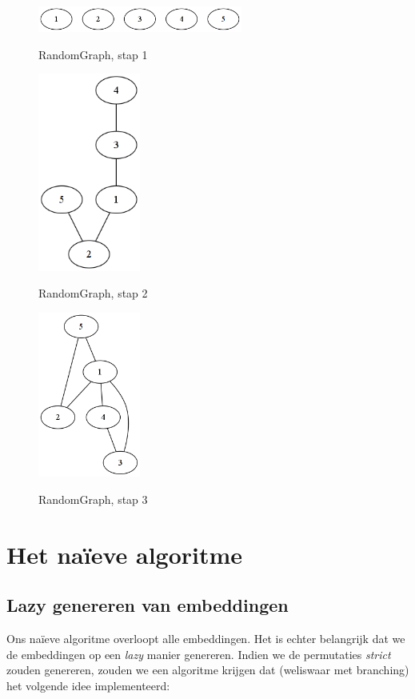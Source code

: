 \documentclass{article}
\begin{document}
\begin{figure}
\begin{center}
\includegraphics[width=0.6\textwidth]{images/randomgraph-01.png}
\caption{RandomGraph, stap 1}
\label{fig:randomgraph-01}
\includegraphics[width=0.3\textwidth]{images/randomgraph-02.png}
\caption{RandomGraph, stap 2}
\label{fig:randomgraph-02}
\includegraphics[width=0.3\textwidth]{images/randomgraph-03.png}
\caption{RandomGraph, stap 3}
\label{fig:randomgraph-03}
\end{center}
\end{figure}

\section{Het na\"ieve algoritme}

\subsection{Lazy genereren van embeddingen}
Ons na\"ieve algoritme overloopt alle embeddingen. Het is echter belangrijk dat
we de embeddingen op een \emph{lazy} manier genereren. Indien we de permutaties
\emph{strict} zouden genereren, zouden we een algoritme krijgen dat (weliswaar
met branching) het volgende idee implementeerd:
\end{document}
